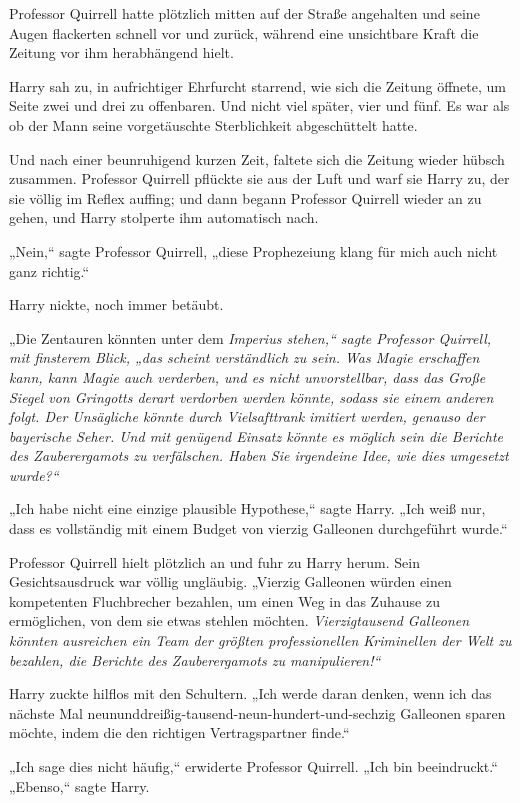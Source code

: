 {Professor Quirrell hatte plötzlich mitten auf der Straße angehalten und seine Augen flackerten schnell vor und zurück, während eine unsichtbare Kraft die Zeitung vor ihm herabhängend hielt.

Harry sah zu, in aufrichtiger Ehrfurcht starrend, wie sich die Zeitung öffnete, um Seite zwei und drei zu offenbaren. Und nicht viel später, vier und fünf. Es war als ob der Mann seine vorgetäuschte Sterblichkeit abgeschüttelt hatte.

Und nach einer beunruhigend kurzen Zeit, faltete sich die Zeitung wieder hübsch zusammen. Professor Quirrell pflückte sie aus der Luft und warf sie Harry zu, der sie völlig im Reflex auffing; und dann begann Professor Quirrell wieder an zu gehen, und Harry stolperte ihm automatisch nach.

„Nein,“ sagte Professor Quirrell, „diese Prophezeiung klang für mich auch nicht ganz richtig.“

Harry nickte, noch immer betäubt.

„Die Zentauren könnten unter dem \emph{Imperius stehen,“ sagte Professor Quirrell, mit finsterem Blick, „\emph{das} scheint verständlich zu sein. Was Magie erschaffen kann, kann Magie auch verderben, und es nicht unvorstellbar, dass das Große Siegel von Gringotts derart verdorben werden könnte, sodass sie einem anderen folgt. Der Unsägliche könnte durch Vielsafttrank imitiert werden, genauso der bayerische Seher. Und mit \emph{genügend} Einsatz könnte es möglich sein die Berichte des Zauberergamots zu verfälschen. Haben Sie irgendeine Idee, wie dies umgesetzt wurde?“}

„Ich habe nicht eine einzige plausible Hypothese,“ sagte Harry. „Ich weiß nur, dass es vollständig mit einem Budget von vierzig Galleonen durchgeführt wurde.“

Professor Quirrell hielt plötzlich an und fuhr zu Harry herum. Sein Gesichtsausdruck war völlig ungläubig. „Vierzig Galleonen würden einen kompetenten Fluchbrecher bezahlen, um einen Weg in das Zuhause zu ermöglichen, von dem sie etwas stehlen möchten. \emph{Vierzigtausend Galleonen \emph{könnten} ausreichen ein Team der größten professionellen Kriminellen der Welt zu bezahlen, die Berichte des Zauberergamots zu manipulieren!“}

Harry zuckte hilflos mit den Schultern. „Ich werde daran denken, wenn ich das nächste Mal neununddreißig-tausend-neun-hundert-und-sechzig Galleonen sparen möchte, indem die den richtigen Vertragspartner finde.“

„Ich sage dies nicht häufig,“ erwiderte Professor Quirrell. „Ich bin beeindruckt.“\\ „Ebenso,“ sagte Harry.

}
